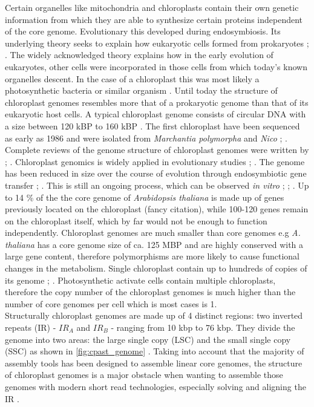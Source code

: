 Certain organelles like mitochondria and chloroplasts contain their own genetic information from which they
are able to synthesize certain proteins independent of the core genome. Evolutionary this developed during
endosymbiosis. Its underlying theory seeks to explain how eukaryotic cells formed from prokaryotes
\cite{mereschkowsky1905uber}; \cite{kutschera2005endosymbiosis}. The widely acknowledged theory explains how
in the early evolution of eukaryotes, other cells were incorporated in those cells from which today's known
organelles descent. In the case of a chloroplast this was most likely a photosynthetic bacteria or similar
organism \cite{archibald2015endosymbiosis}. Until today the structure of chloroplast genomes resembles more
that of a prokaryotic genome than that of its eukaryotic host cells. A typical chloroplast genome consists of
circular DNA with a size between 120 kBP to 160 kBP \cite{palmer_1985}. The first chloroplast have been
sequenced as early as 1986 and were isolated from \textit{Marchantia polymorpha} and \textit{Nico}
\cite{ohyama_chloroplast_1986}; \cite{shinozaki_complete_1986}. Complete reviews of the genome structure of
chloroplast genomes were written by \cite{green_chloroplast_2011}; \cite{wicke_evolution_2011}. Chloroplast
genomics is widely applied in evolutionary studies \cite{martin_evolutionary_2002};
\cite{xiao-ming_inferring_2017}. The genome has been reduced in size over the course of evolution through
endosymbiotic gene transfer \cite{martin_evolutionary_2002}; \cite{deiner_environmental_2017}. This is still
an ongoing process, which can be observed \textit{in vitro} \cite{bock2017witnessing};
\cite{fuentes2014horizontal}; \cite{stegemann2009exchange}. Up to 14 \% of the the core genome of
\textit{Arabidopsis thaliana} is made up of genes previously located on the chloroplast (fancy citation),
while 100-120 genes remain on the chloroplast \cite{wicke_evolution_2011} itself, which by far would not be
enough to function independently. Chloroplast genomes are much smaller than core genomes e.g
\textit{A. thaliana} has a core genome size of ca. 125 MBP and are highly conserved with a large gene content,
therefore polymorphisms are more likely to cause functional changes in the metabolism. Single chloroplast
contain up to hundreds of copies of its genome \cite{kumar_2014}; \cite{bendich_1987}. Photosynthetic activate
cells contain multiple chloroplasts, therefore the copy number of the chloroplast genomes is much higher than
the number of core genomes per cell which is most cases is 1.\\
Structurally chloroplast genomes are made up of 4 distinct regions: two inverted repeats (IR) - $IR_A$ and
$IR_B$ - ranging from 10 kbp to 76 kbp. They divide the genome into two areas: the large single copy (LSC) and
the small single copy (SSC) as shown in \ref{fig:cpast_genome} \cite{palmer_1985}. Taking into account that
the majority of assembly tools has been designed to assemble linear core genomes, the structure of chloroplast
genomes is a major obstacle when wanting to assemble those genomes with modern short read technologies,
especially solving and aligning the IR \cite{Wang2018}.

